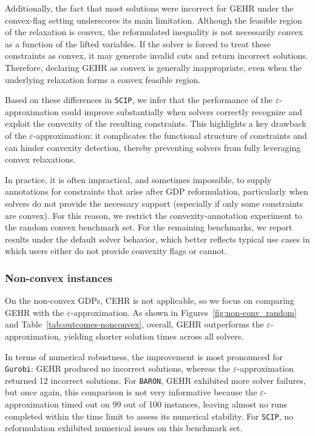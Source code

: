 \documentclass[11pt]{article}
\begin{document}
Additionally, the fact that most solutions were incorrect for GEHR under the convex-flag setting underscores its main limitation.
Although the feasible region of the relaxation is convex, the reformulated inequality is not necessarily convex as a function of the lifted variables.
If the solver is forced to treat these constraints as convex, it may generate invalid cuts and return incorrect solutions. Therefore, declaring GEHR as convex is generally inappropriate, even when the underlying relaxation forms a convex feasible region.

Based on these differences in \texttt{SCIP}, we infer that the performance of the $\varepsilon$-approximation could improve substantially when solvers correctly recognize and exploit the convexity of the resulting constraints. This highlights a key drawback of the $\varepsilon$-approximation: it complicates the functional structure of constraints and can hinder convexity detection, thereby preventing solvers from fully leveraging convex relaxations.



In practice, it is often impractical, and sometimes impossible, to supply annotations for constraints that arise after GDP reformulation, particularly when solvers do not provide the necessary support (especially if only some constraints are convex).
For this reason, we restrict the convexity-annotation experiment to the random convex benchmark set. For the remaining benchmarks, we report results under the default solver behavior, which better reflects typical use cases in which users either do not provide convexity flags or cannot.



\subsubsection{Non-convex instances}
On the non-convex GDPs, CEHR is not applicable, so we focus on comparing GEHR with the $\varepsilon$-approximation. 
As shown in Figures~\ref{fig:non-conv_random} and Table~\ref{tab:outcomes-nonconvex}, overall, GEHR outperforms the $\varepsilon$-approximation, yielding shorter solution times across all solvers.

In terms of numerical robustness, the improvement is most pronounced for \texttt{Gurobi}: GEHR produced no incorrect solutions, whereas the $\varepsilon$-approximation returned 12 incorrect solutions.
For \texttt{BARON}, GEHR exhibited more solver failures, but once again, this comparison is not very informative because the $\varepsilon$-approximation timed out on 99 out of 100 instances, leaving almost no runs completed within the time limit to assess its numerical stability.
For \texttt{SCIP}, no reformulation exhibited numerical issues on this benchmark set.
\end{document}
